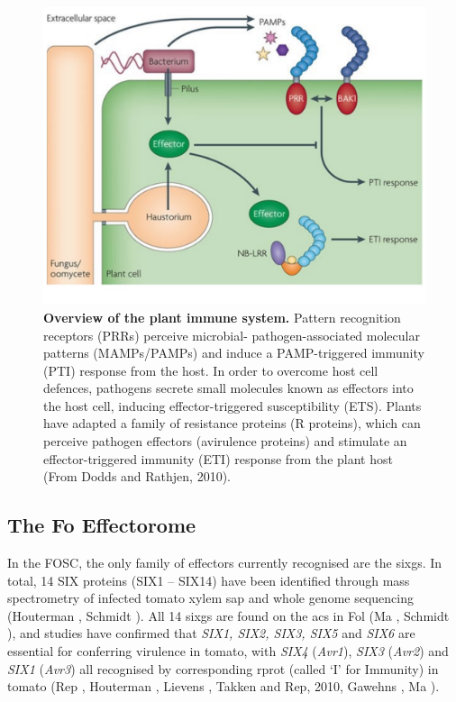 \begin{figure}[h!]
    \centering
    \includegraphics[width=14cm]{Figures/DoddsArticleModel.pdf}
    \caption[Overview of the plant immune system.]{\textbf{Overview of the plant immune system.} Pattern recognition receptors (PRRs) perceive microbial- pathogen-associated molecular patterns (MAMPs/PAMPs) and induce a PAMP-triggered immunity (PTI) response from the host. In order to overcome host cell defences, pathogens secrete small molecules known as effectors into the host cell, inducing effector-triggered susceptibility (ETS). Plants have adapted a family of resistance proteins (R proteins), which can perceive pathogen effectors (avirulence proteins) and stimulate an effector-triggered immunity (ETI) response from the plant host (From Dodds and Rathjen, 2010).}
    \label{fig:PlantImmuneSystem}
\end{figure}

\subsection{The \acl{Fo} Effectorome}

In the \ac{FOSC}, the only family of effectors currently recognised are the \acp{sixg}. In total, 14 SIX proteins (SIX1 – SIX14) have been identified through mass spectrometry of infected tomato xylem sap and whole genome sequencing (Houterman , Schmidt ).  All 14 \acp{sixg} are found on the \acp{ac} in \ac{Fol} (Ma , Schmidt ), and studies have confirmed that \textit{SIX1, SIX2, SIX3, SIX5} and \textit{SIX6} are essential for conferring virulence in tomato, with  \textit{SIX4} (\textit{Avr1}), \textit{SIX3} (\textit{Avr2}) and \textit{SIX1} (\textit{Avr3}) all recognised by corresponding \ac{rprot} (called ‘I’ for Immunity) in tomato (Rep , Houterman , Lievens , Takken and Rep, 2010, Gawehns , Ma ).  

